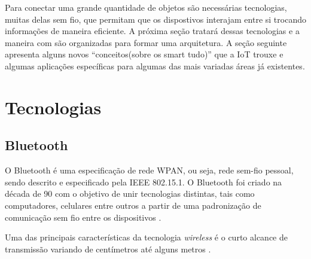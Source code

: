 Para conectar uma grande quantidade de objetos são necessárias tecnologias, muitas delas sem fio, 
que permitam que os dispostivos interajam entre si trocando informações de maneira eficiente. A 
próxima seção tratará dessas tecnologias e a maneira com são organizadas para formar uma 
arquitetura. A seção seguinte apresenta alguns novos ``conceitos(sobre os smart tudo)'' que a IoT 
trouxe e algumas aplicações específicas para algumas das mais variadas áreas já existentes.




\section{Tecnologias}









\subsection{Bluetooth}

O Bluetooth é uma especificação de rede WPAN, ou seja, rede sem-fio pessoal, sendo descrito e 
especificado pela IEEE 802.15.1. O Bluetooth foi criado na década de 90 com o objetivo de unir
tecnologias distintas, tais como computadores, celulares entre outros a partir de uma padronização 
de comunicação sem fio entre os dispositivos \cite{jimkardach2008}. 


Uma das principais características da tecnologia \textit{wireless} é o curto alcance de 
transmissão variando de centímetros até alguns metros \cite{huang2007bluetooth}. 

